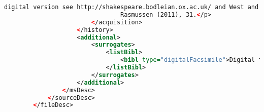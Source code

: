 \documentclass[class=article, crop=false]{standalone}
\begin{document}
\begin{lstlisting}[language=XML]
                                digital version see http://shakespeare.bodleian.ox.ac.uk/ and West and
                                Rasmussen (2011), 31.</p>
                        </acquisition>
                    </history>
                    <additional>
                        <surrogates>
                            <listBibl>
                                <bibl type="digitalFacsimile">Digital facsimile images available at: <ref target="http://firstfolio.bodleian.ox.ac.uk/">http://firstfolio.bodleian.ox.ac.uk/</ref>.</bibl>
                            </listBibl>
                        </surrogates>
                    </additional>
                </msDesc>
            </sourceDesc>
        </fileDesc>
\end{lstlisting}
\end{document}
